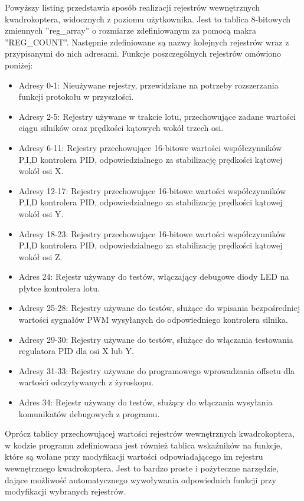 Powyższy listing przedstawia sposób realizacji rejestrów wewnętrznych kwadrokoptera, widocznych z poziomu użytkownika. Jest to tablica 8-bitowych zmiennych ''reg\_array'' o rozmiarze zdefiniowanym za pomocą makra ''REG\_COUNT''. Następnie zdefiniowane są nazwy kolejnych rejestrów wraz z przypisanymi do nich adresami. Funkcje poszczególnych rejestrów omówiono poniżej:
\begin{itemize}
	\item Adresy 0-1: Nieużywane rejestry, przewidziane na potrzeby rozszerzania funkcji protokołu w przyszłości.
	\item Adresy 2-5: Rejestry używane w trakcie lotu, przechowujące zadane wartości ciągu silników oraz prędkości kątowych wokół trzech osi.
	\item Adresy 6-11: Rejestry przechowujące 16-bitowe wartości współczynników P,I,D kontrolera PID, odpowiedzialnego za stabilizację prędkości kątowej wokół osi X.
	\item Adresy 12-17: Rejestry przechowujące 16-bitowe wartości współczynników P,I,D kontrolera PID, odpowiedzialnego za stabilizację prędkości kątowej wokół osi Y.
	\item Adresy 18-23: Rejestry przechowujące 16-bitowe wartości współczynników P,I,D kontrolera PID, odpowiedzialnego za stabilizację prędkości kątowej wokół osi Z.
	\item Adres 24: Rejestr używany do testów, włączający debugowe diody LED na płytce kontrolera lotu.
	\item Adresy 25-28: Rejestry używane do testów, służące do wpisania bezpośredniej wartości sygnałów PWM wysyłanych do odpowiedniego kontrolera silnika.
	\item Adresy 29-30: Rejestry używane do testów, służące do włączania testowania regulatora PID dla osi X lub Y.
	\item Adresy 31-33: Rejestry używane do programowego wprowadzania offsetu dla wartości odczytywanych z żyroskopu.
	\item Adres 34: Rejestr używany do testów, służący do włączania wysyłania komunikatów debugowych z programu.
\end{itemize}

Oprócz tablicy przechowującej wartości rejestrów wewnętrznych kwadrokoptera, w kodzie programu zdefiniowana jest również tablica wskaźników na funkcje, które są wołane przy modyfikacji wartości odpowiadającego im rejestru wewnętrznego kwadrokoptera. Jest to bardzo proste i pożyteczne narzędzie, dające możliwość automatycznego wywoływania odpowiednich funkcji przy modyfikacji wybranych rejestrów.

